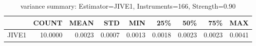 \begin{table}[ht]
\centering
\caption{variance summary: Estimator=JIVE1, Instruments=166, Strength=0.90}
\begin{tabular}{lrrrrrrrr}
\toprule
 & COUNT & MEAN & STD & MIN & 25\% & 50\% & 75\% & MAX \\
\midrule
JIVE1 & 10.0000 & 0.0023 & 0.0007 & 0.0013 & 0.0018 & 0.0023 & 0.0023 & 0.0041 \\
\bottomrule
\end{tabular}
\end{table}
